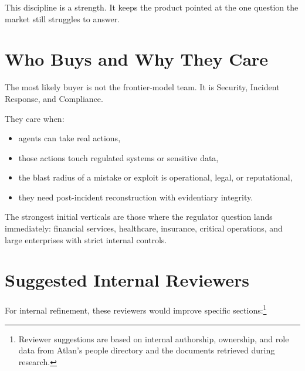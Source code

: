\documentclass[11pt]{article}
\begin{document}
This discipline is a strength. It keeps the product pointed at the one question the market still struggles to answer.

\section{Who Buys and Why They Care}

The most likely buyer is not the frontier-model team. It is Security, Incident Response, and Compliance.

They care when:
\begin{itemize}[leftmargin=1.5em]
    \item agents can take real actions,
    \item those actions touch regulated systems or sensitive data,
    \item the blast radius of a mistake or exploit is operational, legal, or reputational,
    \item they need post-incident reconstruction with evidentiary integrity.
\end{itemize}

The strongest initial verticals are those where the regulator question lands immediately: financial services, healthcare, insurance, critical operations, and large enterprises with strict internal controls.

\section{Suggested Internal Reviewers}

For internal refinement, these reviewers would improve specific sections:\footnote{Reviewer suggestions are based on internal authorship, ownership, and role data from Atlan's people directory and the documents retrieved during research.}
\end{document}
